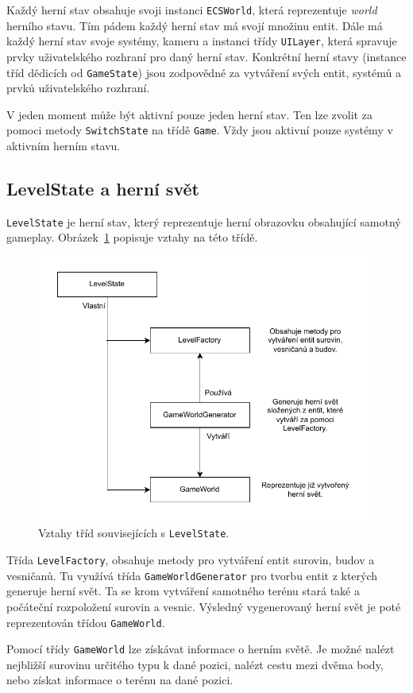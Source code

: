 Každý herní stav obsahuje svoji instanci \texttt{ECSWorld}, která reprezentuje \textit{world} herního stavu. Tím pádem každý herní stav má svojí množinu entit. Dále má každý herní stav svoje systémy, kameru a instanci třídy \texttt{UILayer}, která spravuje prvky uživatelského rozhraní pro daný herní stav. Konkrétní herní stavy (instance tříd dědicích od \texttt{GameState}) jsou zodpovědné za vytváření svých entit, systémů a prvků uživatelského rozhraní.

V jeden moment může být aktivní pouze jeden herní stav. Ten lze zvolit za pomoci metody \texttt{SwitchState} na třídě \texttt{Game}. Vždy jsou aktivní pouze systémy v aktivním herním stavu.

\subsection{LevelState a herní svět}
\texttt{LevelState} je herní stav, který reprezentuje herní obrazovku obsahující samotný gameplay. Obrázek~\ref{fig:level-state} popisuje vztahy na této třídě.

\begin{figure}[!htb]
  \centering
  \includegraphics[width=0.7\linewidth]{img/level-state.pdf}
  \caption{Vztahy tříd souvisejících s \texttt{LevelState}.}
  \label{fig:level-state}
\end{figure}

Třída \texttt{LevelFactory}, obsahuje metody pro vytváření entit surovin, budov a vesničanů. Tu využívá třída \texttt{GameWorldGenerator} pro tvorbu entit z kterých generuje herní svět. Ta se krom vytváření samotného terénu stará také a počáteční rozpoložení surovin a vesnic. Výsledný vygenerovaný herní svět je poté reprezentován třídou \texttt{GameWorld}.

Pomocí třídy \texttt{GameWorld} lze získávat informace o herním světě. Je možné nalézt nejbližší surovinu určitého typu k dané pozici, nalézt cestu mezi dvěma body, nebo získat informace o terénu na dané pozici.

